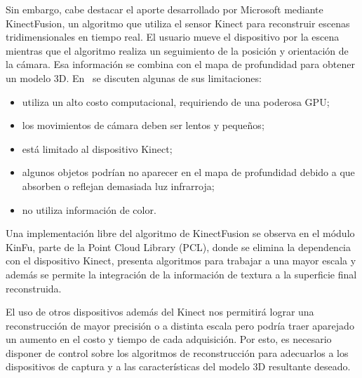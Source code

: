 	Sin embargo, cabe destacar el aporte desarrollado por Microsoft mediante
	KinectFusion, un algoritmo que utiliza el sensor Kinect para reconstruir escenas tridimensionales en tiempo real.
	El usuario mueve el dispositivo por la escena mientras que el algoritmo realiza un seguimiento de la posición y orientación de la cámara. Esa información se combina con el mapa de profundidad para obtener un modelo 3D.
	En~\cite{real-time-3d-reconstruction-using-a-kinect-sensor} %
	se discuten algunas de sus limitaciones:
	\begin{itemize}
		\item utiliza un alto costo computacional, requiriendo de una poderosa GPU;
		\item los movimientos de cámara deben ser lentos y pequeños;
		\item está limitado al dispositivo Kinect;
		\item algunos objetos podrían no aparecer en el mapa de profundidad debido a que absorben o reflejan demasiada luz infrarroja;
		\item no utiliza información de color.
	\end{itemize}

	Una implementación libre del algoritmo de KinectFusion se observa en el módulo KinFu,
	parte de la Point Cloud Library (PCL),
	donde se elimina la dependencia con el dispositivo Kinect,
	presenta algoritmos para trabajar a una mayor escala
	y además se permite la integración de la información de textura a la superficie final reconstruida.

	El uso de otros dispositivos además del Kinect nos permitirá lograr una reconstrucción de mayor precisión o a distinta escala pero podría traer aparejado un aumento en el costo y tiempo de cada adquisición.
	Por esto, es necesario disponer de control sobre los algoritmos de reconstrucción para adecuarlos a los dispositivos de captura y a las características del modelo 3D resultante deseado.

